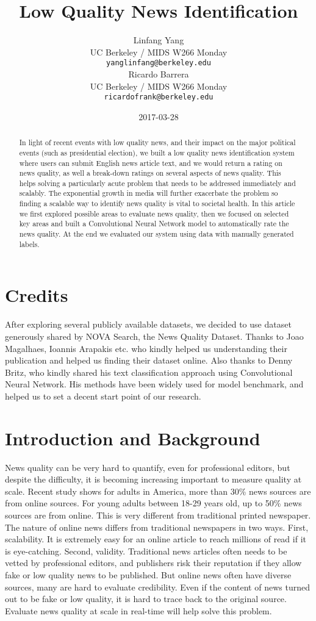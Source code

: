 \documentclass[11pt]{article}
\title{Low Quality News Identification}
\author{Linfang Yang \\
  UC Berkeley / MIDS W266 Monday\\
  {\tt yanglinfang@berkeley.edu} \\\And
  Ricardo Barrera \\
  UC Berkeley / MIDS W266 Monday \\
  {\tt ricardofrank@berkeley.edu} \\}
\date{2017-03-28}
\begin{document}
\maketitle
\begin{abstract}
 In light of recent events with low quality news, and their impact on the major political events (such as presidential election), we built a low quality news identification system where users can submit English news article text, and we would return a rating on news quality, as well a break-down ratings on several aspects of news quality.  This helps solving a particularly acute problem that needs to be addressed immediately and scalably. The exponential growth in media will further exacerbate the problem so finding a scalable way to identify news quality is vital to societal health. In this article we first explored possible areas to evaluate news quality, then we focused on selected key areas and built a Convolutional Neural Network model to automatically rate the news quality. At the end we evaluated our system using data with manually generated labels. 
\end{abstract}

\section{Credits}

After exploring several publicly available datasets, we decided to use dataset generously shared by NOVA Search, the News Quality Dataset. Thanks to Joao Magalhaes, Ioannis Arapakis etc. who kindly helped us understanding their publication and helped us finding their dataset online. Also thanks to Denny Britz, who kindly shared his text classification approach using Convolutional Neural Network. His methods have been widely used for model benchmark, and helped us to set a decent start point of our research. 

\section{Introduction and Background}

News quality can be very hard to quantify, even for professional editors, but despite the difficulty, it is becoming increasing important to measure quality at scale. Recent study shows for adults in America, more than 30\% news sources are from online sources. For young adults between 18-29 years old, up to 50\% news sources are from online. This is very different from traditional printed newspaper. The nature of online news differs from traditional newspapers in two ways. First, scalability. It is extremely easy for an online article to reach millions of read if it is eye-catching. Second, validity. Traditional news articles often needs to be vetted by professional editors, and publishers risk their reputation if they allow fake or low quality news to be published. But online news often have diverse sources, many are hard to evaluate credibility. Even if the content of news turned out to be fake or low quality, it is hard to trace back to the original source.  Evaluate news quality at scale in real-time will help solve this problem.  
\end{document}
